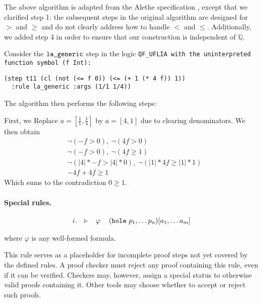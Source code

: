 The above algorithm is adapted from the Alethe specification \cite{alethespec}, except that we clarified step 1: the subsequent steps in the original algorithm are designed for $>$ and $\geq$ and do not clearly address how to handle $<$ and $\leq$.
Additionally, we added step 4 in order to ensure that our construction is independent of $\mathbb{Q}$.

\begin{example}
Consider the $\tt{la\_generic}$ step in the logic \tt{QF\_UFLIA} with the uninterpreted function symbol \lstinline[language=SMT,basicstyle=\ttfamily\upshape]|(f Int)|:
\begin{lstlisting}[language=SMT,label={lst:lageneric-example}]
(step t11 (cl (not (<= f 0)) (<= (+ 1 (* 4 f)) 1))
  :rule la_generic :args (1/1 1/4))
\end{lstlisting}
%
The algorithm then performs the following steps:

\smallskip

First, we Replace $a = [\frac{1}{1}, \frac{1}{4}]$ by $a = [4, 1]$  due to clearing denominators. We then obtain
\begin{align}
&\neg (- f > 0),~ \neg(4f > 0) \label{eq:step2}\tag{Steps 1 and 2}\\
&\neg (- f > 0),~ \neg(4f \geq 1) \label{eq:step3}\tag{Step 3}\\
&\neg (|4| * - f > |4| * 0 ), ~ \neg(|1| * 4f \geq |1| * 1) \label{eq:step5}\tag{Step 4} \\
&-4f + 4f \geq 1 \label{eq:step6}\tag{Step 5}
\end{align}
Which sums to the contradiction  $0 \geq 1$.
\label{ex:la_generic_example_red}
\end{example}

\paragraph{Special rules.}

\begin{equation}\label{eq:hole}
\begin{tabular}{l c r}
$i.\quad \triangleright$ & $\varphi$ & $(\kw{hole}~p_1, \dots p_n) [a_1, \dots a_m]$
\end{tabular}
\end{equation}

where $\varphi$ is any well-formed formula.

This rule serves as a placeholder for incomplete proof steps not yet covered by the defined rules.
A proof checker must reject any proof containing this rule, even if it can be verified.
Checkers may, however, assign a special status to otherwise valid proofs containing it.
Other tools may choose whether to accept or reject such proofs.

